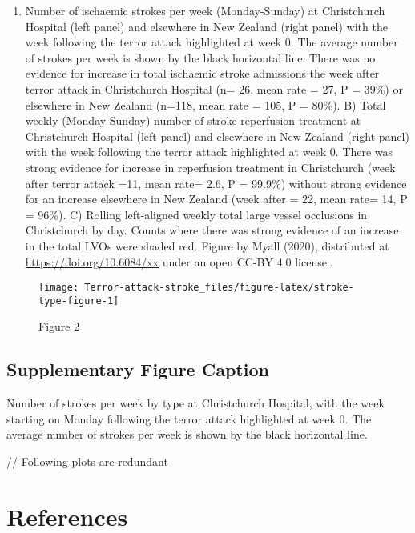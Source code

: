 \documentclass[
]{article}
\providecommand{\tightlist}{%
  \setlength{\itemsep}{0pt}\setlength{\parskip}{0pt}}
\begin{document}
\begin{enumerate}
\def\labelenumi{\Alph{enumi})}
\tightlist
\item
  Number of ischaemic strokes per week (Monday-Sunday) at Christchurch
  Hospital (left panel) and elsewhere in New Zealand (right panel) with
  the week following the terror attack highlighted at week 0. The
  average number of strokes per week is shown by the black horizontal
  line. There was no evidence for increase in total ischaemic stroke
  admissions the week after terror attack in Christchurch Hospital (n=
  26, mean rate = 27, P = 39\%) or elsewhere in New Zealand (n=118, mean
  rate = 105, P = 80\%). B) Total weekly (Monday-Sunday) number of
  stroke reperfusion treatment at Christchurch Hospital (left panel) and
  elsewhere in New Zealand (right panel) with the week following the
  terror attack highlighted at week 0. There was strong evidence for
  increase in reperfusion treatment in Christchurch (week after terror
  attack =11, mean rate= 2.6, P = 99.9\%) without strong evidence for an
  increase elsewhere in New Zealand (week after = 22, mean rate= 14, P =
  96\%). C) Rolling left-aligned weekly total large vessel occlusions in
  Christchurch by day. Counts where there was strong evidence of an
  increase in the total LVOs were shaded red. Figure by Myall (2020),
  distributed at \url{https://doi.org/10.6084/xx} under an open CC-BY
  4.0 license..
\end{enumerate}

\begin{figure}
\texttt{[image: Terror-attack-stroke\_files/figure-latex/stroke-type-figure-1]} \caption{Figure 2}\label{fig:stroke-type-figure}
\end{figure}

\hypertarget{supplementary-figure-caption}{%
\subsection{Supplementary Figure
Caption}\label{supplementary-figure-caption}}

Number of strokes per week by type at Christchurch Hospital, with the
week starting on Monday following the terror attack highlighted at week
0. The average number of strokes per week is shown by the black
horizontal line.

// Following plots are redundant

\hypertarget{references}{%
\section{References}\label{references}}
\end{document}
